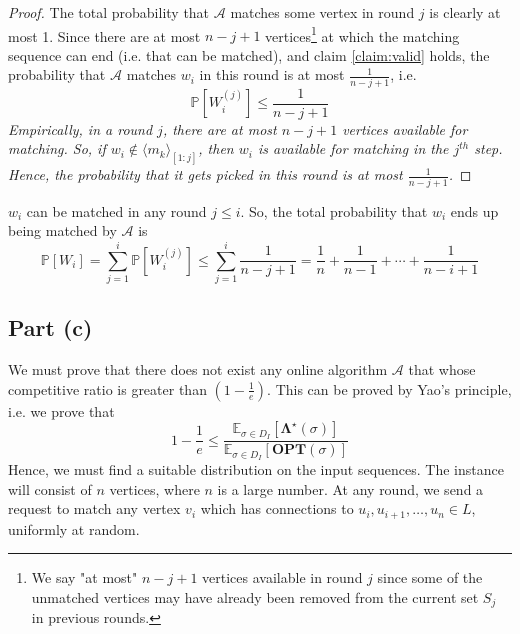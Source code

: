 \documentclass[11pt]{article}
\begin{document}
\begin{proof}
    The total probability that $\mathcal{A}$ matches some vertex in round $j$ is clearly at most 1.
    Since there are at most $n-j+1$ vertices\footnote{
        We say "at most" $n-j+1$ vertices available in round $j$ since some of the unmatched
        vertices may have already been removed from the current set $S_{j}$ in previous rounds.
    } at which the matching sequence can end (i.e. that can be matched),
    and claim \ref{claim:valid} holds, the probability that $\mathcal{A}$ matches $w_{i}$ in this round is at most $\frac{1}{n-j+1}$, i.e.
    \begin{equation}
        \mathbb{P} \left[ W_{i}^{(j)} \right] \leq \frac{1}{n-j+1}
    \end{equation}
\textit{Empirically, in a round $j$, there are at most $n-j+1$ vertices available for matching. So, if
$w_{i} \notin \langle m_{k} \rangle_{[1:j]}$, then $w_{i}$ is available for matching in the $j^{th}$ step.
Hence, the probability that it gets picked in this round is at most $\frac{1}{n-j+1}$.}
\end{proof}
$w_{i}$ can be matched in any round $j \leq i$. So, the total probability that $w_{i}$ ends up being matched
by $\mathcal{A}$ is
\begin{equation}
    \mathbb{P} \left[ W_{i} \right] = \sum_{j=1}^{i} \mathbb{P} \left[ W_{i}^{(j)} \right] \leq \sum_{j=1}^{i} \frac{1}{n-j+1} = \frac{1}{n} + \frac{1}{n-1} + \cdots + \frac{1}{n-i+1}
\end{equation}

\subsection*{Part (c)}
We must prove that there does not exist any online algorithm $\mathcal{A}$ that whose
competitive ratio is greater than $\left( 1 - \frac{1}{e} \right)$. This can be proved by Yao's
principle, i.e. we prove that
\begin{equation}
    1 - \frac{1}{e} \leq \frac{\mathbb{E}_{\sigma \in D_{I}} [\mathbf{\Lambda}^{\star}(\sigma)]}{\mathbb{E}_{\sigma \in D_{I}}[\mathbf{OPT}(\sigma)]}
\end{equation}
Hence, we must find a suitable distribution on the input sequences. The instance will consist of
$n$ vertices, where $n$ is a large number. At any round, we send a request to match
any vertex $v_{i}$ which has connections to $u_{i}, u_{i+1}, \ldots, u_{n} \in L$, uniformly at random.
\end{document}
